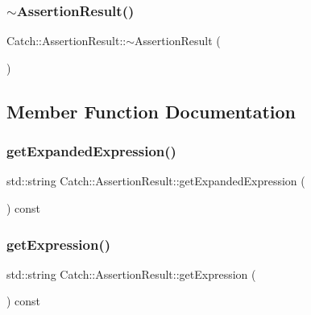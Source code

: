 \hypertarget{class_catch_1_1_assertion_result_abf90f5abd04d38b2fb4f5d575bdc4f1e}{}\label{class_catch_1_1_assertion_result_abf90f5abd04d38b2fb4f5d575bdc4f1e} 
\subsubsection{\texorpdfstring{$\sim$\+Assertion\+Result()}{~AssertionResult()}}
{\footnotesize\ttfamily Catch\+::\+Assertion\+Result\+::$\sim$\+Assertion\+Result (\begin{DoxyParamCaption}{ }\end{DoxyParamCaption})}



\subsection{Member Function Documentation}
\hypertarget{class_catch_1_1_assertion_result_aaa46070791a6c07caaed86229b8d9d75}{}\label{class_catch_1_1_assertion_result_aaa46070791a6c07caaed86229b8d9d75} 
\subsubsection{\texorpdfstring{get\+Expanded\+Expression()}{getExpandedExpression()}}
{\footnotesize\ttfamily std\+::string Catch\+::\+Assertion\+Result\+::get\+Expanded\+Expression (\begin{DoxyParamCaption}{ }\end{DoxyParamCaption}) const}

\hypertarget{class_catch_1_1_assertion_result_a26a777f3959353c729544cb2ace0d279}{}\label{class_catch_1_1_assertion_result_a26a777f3959353c729544cb2ace0d279} 
\subsubsection{\texorpdfstring{get\+Expression()}{getExpression()}}
{\footnotesize\ttfamily std\+::string Catch\+::\+Assertion\+Result\+::get\+Expression (\begin{DoxyParamCaption}{ }\end{DoxyParamCaption}) const}

